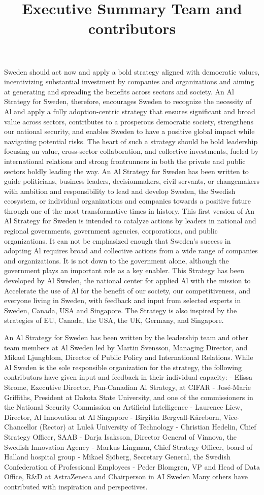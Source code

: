 \title{
Executive Summary
}
Sweden should act now and apply a bold strategy aligned with democratic values, incentivizing substantial investment by companies and organizations and aiming at generating and spreading the benefits across sectors and society.
An Al Strategy for Sweden, therefore, encourages Sweden to recognize the necessity of Al and apply a fully adoption-centric strategy that ensures significant and broad value across sectors, contributes to a prosperous democratic society, strengthens our national security, and enables Sweden to have a positive global impact while navigating potential risks.
The heart of such a strategy should be bold leadership focusing on value, cross-sector collaboration, and collective investments, fueled by international relations and strong frontrunners in both the private and public sectors boldly leading the way.
An Al Strategy for Sweden has been written to guide politicians, business leaders, decisionmakers, civil servants, or changemakers with ambition and responsibility to lead and develop Sweden, the Swedish ecosystem, or individual organizations and companies towards a positive future through one of the most transformative times in history.
This first version of An Al Strategy for Sweden is intended to catalyze actions by leaders in national and regional governments, government agencies, corporations, and public organizations.
It can not be emphasized enough that Sweden's success in adopting Al requires broad and collective actions from a wide range of companies and organizations. It is not down to the government alone, although the government plays an important role as a key enabler.
This Strategy has been developed by Al Sweden, the national center for applied Al with the mission to Accelerate the use of Al for the benefit of our society, our competitiveness, and everyone living in Sweden, with feedback and input from selected experts in Sweden, Canada, USA and Singapore. The Strategy is also inspired by the strategies of EU, Canada, the USA, the UK, Germany, and Singapore.

\title{
Team and contributors
}
An Al Strategy for Sweden has been written by the leadership team and other team members at Al Sweden led by Martin Svensson, Managing Director, and Mikael Ljungblom, Director of Public Policy and International Relations.
While Al Sweden is the sole responsible organization for the strategy, the following contributors have given input and feedback in their individual capacity:
- Elissa Strome, Executive Director, Pan-Canadian Al Strategy, at CIFAR
- José-Marie Griffiths, President at Dakota State University, and one of the commissioners in the National Security Commission on Artificial Intelligence
- Laurence Liew, Director, Al Innovation at Al Singapore
- Birgitta Bergvall-Kåreborn, Vice-Chancellor (Rector) at Luleå University of Technology
- Christian Hedelin, Chief Strategy Officer, SAAB
- Darja Isaksson, Director General of Vinnova, the Swedish Innovation Agency
- Markus Lingman, Chief Strategy Officer, board of Halland hospital group
- Mikael Sjöberg, Secretary General, the Swedish Confederation of Professional Employees
- Peder Blomgren, VP and Head of Data Office, R\&D at AstraZeneca and Chairperson in AI Sweden
Many others have contributed with inspiration and perspectives.

